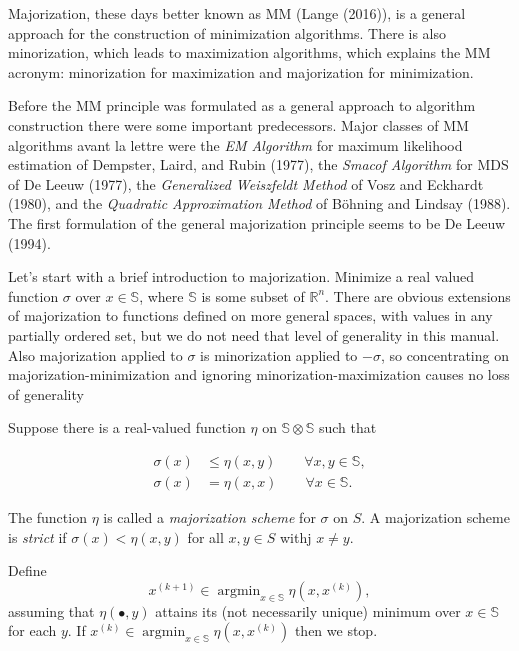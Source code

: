 \documentclass[
  12pt,
]{article}
\begin{document}
Majorization, these days better known as MM (Lange (2016)), is a general
approach for the construction of minimization algorithms. There is also
minorization, which leads to maximization algorithms, which explains the
MM acronym: minorization for maximization and majorization for
minimization.

Before the MM principle was formulated as a general approach to
algorithm construction there were some important predecessors. Major
classes of MM algorithms avant la lettre were the \emph{EM Algorithm} for
maximum likelihood estimation of Dempster, Laird, and Rubin (1977), the \emph{Smacof
Algorithm} for MDS of De Leeuw (1977), the \emph{Generalized Weiszfeldt Method}
of Vosz and Eckhardt (1980), and the \emph{Quadratic Approximation Method} of
Böhning and Lindsay (1988). The first formulation of the general majorization
principle seems to be De Leeuw (1994).

Let's start with a brief introduction to majorization. Minimize a real
valued function \(\sigma\) over \(x\in\mathbb{S}\), where \(\mathbb{S}\) is
some subset of \(\mathbb{R}^n\). There are obvious extensions of
majorization to functions defined on more general spaces, with values in
any partially ordered set, but we do not need that level of generality
in this manual. Also majorization applied to \(\sigma\) is minorization
applied to \(-\sigma\), so concentrating on majorization-minimization and
ignoring minorization-maximization causes no loss of generality

Suppose there is a real-valued function \(\eta\) on
\(\mathbb{S}\otimes\mathbb{S}\) such that

\begin{align}
\sigma(x)&\leq\eta(x,y)\qquad\forall x,y\in\mathbb{S},\label{eq:maj1}\\
\sigma(x)&=\eta(x,x)\qquad\forall x\in\mathbb{S}.\label{eq:maj2}
\end{align}

The function \(\eta\) is called a \emph{majorization scheme} for \(\sigma\) on
\(S\). A majorization scheme is \emph{strict} if \(\sigma(x)<\eta(x,y)\) for all
\(x,y\in S\) withj \(x\not=y\).

Define \begin{equation}
x^{(k+1)}\in\mathop{\text{argmin}}_{x\in\mathbb{S}}\eta(x,x^{(k)}),
\label{eq:majalg}
\end{equation} assuming that \(\eta(\bullet,y)\) attains its (not
necessarily unique) minimum over \(x\in\mathbb{S}\) for each \(y\). If
\(x^{(k)}\in\mathop{\text{argmin}}_{x\in\mathbb{S}}\eta(x,x^{(k)})\)
then we stop.
\end{document}

